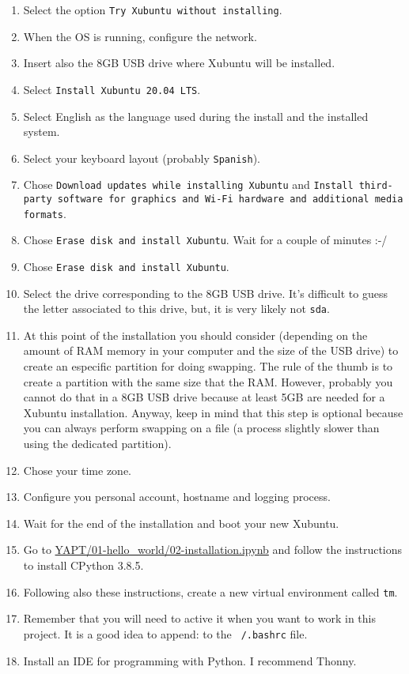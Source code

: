 \begin{enumerate}
\item Select the option \texttt{Try Xubuntu without installing}.
\item When the OS is running, configure the network.
\item Insert also the 8GB USB drive where Xubuntu will be installed.
\item Select \texttt{Install Xubuntu 20.04 LTS}.
\item Select English as the language used during the install and the
  installed system.
\item Select your keyboard layout (probably \texttt{Spanish}).
\item Chose \texttt{Download updates while installing Xubuntu} and
  \texttt{Install third-party software for graphics and Wi-Fi hardware
    and additional media formats}.
\item Chose \texttt{Erase disk and install Xubuntu}. Wait for a couple
  of minutes :-/
\item Chose \texttt{Erase disk and install Xubuntu}.
\item Select the drive corresponding to the 8GB USB drive. It's
  difficult to guess the letter associated to this drive, but, it is
  very likely not \texttt{sda}.
\item At this point of the installation you should consider (depending
  on the amount of RAM memory in your computer and the size of the USB
  drive) to create an especific partition for doing swapping. The rule
  of the thumb is to create a partition with the same size that the
  RAM. However, probably you cannot do that in a 8GB USB drive because
  at least 5GB are needed for a Xubuntu installation. Anyway, keep in
  mind that this step is optional because you can always perform
  swapping on a file (a process slightly slower than using the
  dedicated partition).
\item Chose your time zone.
\item Configure you personal account, hostname and logging process.
\item Wait for the end of the installation and boot your new Xubuntu.
\item Go to
  \href{https://github.com/vicente-gonzalez-ruiz/YAPT/blob/master/01-hello_world/02-installation.ipynb}{YAPT/01-hello\_world/02-installation.ipynb}
  \cite{YAPY} and follow the instructions to install CPython 3.8.5.
\item Following also these instructions, create a new virtual
  environment called \texttt{tm}.
\item Remember that you will need to active it when you want to work
  in this project. It is a good idea to append:
  to the \texttt{~/.bashrc} file.
\item Install an IDE for programming with Python. I recommend Thonny.
\end{enumerate}

